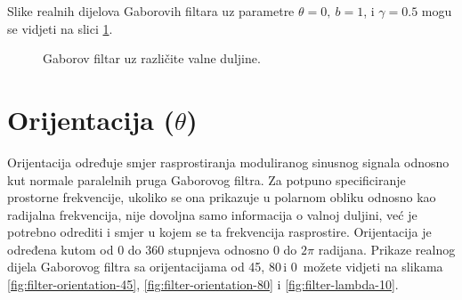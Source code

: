 \documentclass{ru}
\begin{document}
Slike realnih dijelova Gaborovih filtara uz parametre $\theta = 0,\: b
= 1$, i $\gamma = 0.5$ mogu se vidjeti na slici \ref{fig:filter-wavelengths}.

\begin{figure}[h!tb]
\centering
{}
\hspace{50pt}
\caption{Gaborov filtar uz različite valne duljine.}
\label{fig:filter-wavelengths}
\end{figure}



\section{Orijentacija ($\theta$)}
Orijentacija određuje smjer rasprostiranja moduliranog sinusnog signala odnosno
kut normale paralelnih pruga Gaborovog filtra. Za potpuno
specificiranje prostorne frekvencije, ukoliko se ona prikazuje u polarnom
obliku odnosno kao radijalna frekvencija, nije dovoljna samo informacija o
valnoj duljini, već je potrebno odrediti i smjer u kojem se ta frekvencija
rasprostire. Orijentacija je određena kutom od $0$ do $360$ stupnjeva odnosno
$0$ do $2\pi$ radijana. Prikaze realnog dijela Gaborovog filtra sa orijentacijama od 45\textdegree, 80\textdegree\,i 0\textdegree\, možete vidjeti na slikama
\ref{fig:filter-orientation-45}, \ref{fig:filter-orientation-80} i \ref{fig:filter-lambda-10}.
\end{document}
